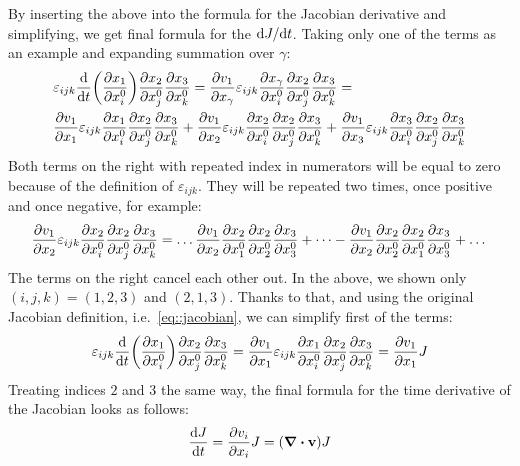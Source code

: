 \documentclass{article}
\providecommand{\levicivita}[3]{%
  \ensuremath{\varepsilon_{{#1}{#2}{#3}}}
}
\begin{document}
By inserting the above into the formula for the Jacobian derivative 
and simplifying, we get final formula for the \(\diffd J/\diffd t\).
Taking only one of the terms as an example and expanding summation 
over \(\gamma\):
\begin{equation*}
  \begin{split}
    & \levicivita{i}{j}{k} \dv{t} \qty( \pdv{x_1}{x^0_i} ) 
      \pdv{x_2}{x^0_j} \pdv{x_3}{x^0_k}
    = \pdv{v_1}{x_\gamma} \levicivita{i}{j}{k} \pdv{x_\gamma}{x^0_i}\pdv{x_2}{x^0_j}
      \pdv{x_3}{x^0_k} =\\
    & \pdv{v_1}{x_1} \levicivita{i}{j}{k} \pdv{x_1}{x^0_i}\pdv{x_2}{x^0_j} \pdv{x_3}{x^0_k} + 
    \pdv{v_1}{x_2} \levicivita{i}{j}{k} \pdv{x_2}{x^0_i}\pdv{x_2}{x^0_j} \pdv{x_3}{x^0_k} +
    \pdv{v_1}{x_3} \levicivita{i}{j}{k} \pdv{x_3}{x^0_i}\pdv{x_2}{x^0_j} \pdv{x_3}{x^0_k}
  \end{split}
\end{equation*}
Both terms on the right with repeated index in numerators will be equal to 
zero because of the definition of \(\levicivita{i}{j}{k}\). They will be 
repeated two times, once positive and once negative, for example:
\[
  \pdv{v_1}{x_2} \levicivita{i}{j}{k} 
  \pdv{x_2}{x^0_i}\pdv{x_2}{x^0_j} \pdv{x_3}{x^0_k} = \dots
  \pdv{v_1}{x_2} 
  \pdv{x_2}{x^0_1}\pdv{x_2}{x^0_2} \pdv{x_3}{x^0_3} + \dots 
  - \pdv{v_1}{x_2} 
  \pdv{x_2}{x^0_2}\pdv{x_2}{x^0_1} \pdv{x_3}{x^0_3} + \dots
\]
The terms on the right cancel each other out. In the above, we shown only 
\((i,j,k) = (1,2,3)\) and \((2,1,3)\).
Thanks to that, and using the original Jacobian definition, 
i.e.~\autoref{eq::jacobian}, we can simplify first of the terms: 
\begin{equation*}
  \levicivita{i}{j}{k} \dv{t} \qty( \pdv{x_1}{x^0_i} ) \pdv{x_2}{x^0_j} 
  \pdv{x_3}{x^0_k}
  = \pdv{v_1}{x_1} \levicivita{i}{j}{k} \pdv{x_1}{x^0_i}\pdv{x_2}{x^0_j} 
  \pdv{x_3}{x^0_k}
  = \pdv{v_1}{x_1} J
\end{equation*}
Treating indices \(2\) and \(3\) the same way, the final formula for the 
time derivative of the Jacobian looks as follows:
\begin{equation}
  \dv{J}{t}  = \pdv{v_i}{x_i} J = \qty(\div\vb{v})J
  \label{eq::ddt_J}
\end{equation}
\end{document}
